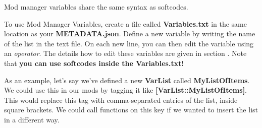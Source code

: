 \documentclass{article}
\begin{document}
Mod manager variables share the same syntax as softcodes.

To use Mod Manager Variables, create a file called \textbf{Variables.txt} in the same location as your \textbf{METADATA.json}. Define a new variable by writing the name of the list in the text file. On each new line, you can then edit the variable using an \textit{operator}. The details how to edit these variables are given in section \label{Section:VariableTypesList}. Note that \textbf{you can use softcodes inside the Variables.txt!}

As an example, let's say we've defined a new \textbf{VarList} called \textbf{MyListOfItems}. We could use this in our mods by tagging it like \textbf{[VarList::MyListOfItems]}. This would replace this tag with comma-separated entries of the list, inside square brackets. We could call functions on this key if we wanted to insert the list in a different way.
\end{document}
